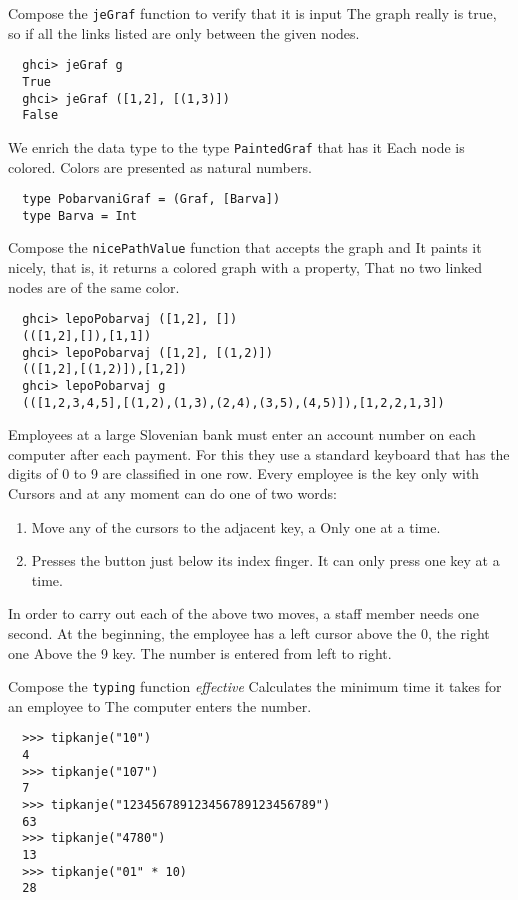 \documentclass[arhiv]{../izpit}
\begin{document}
\podnaloga
Compose the \texttt{jeGraf} function to verify that it is input
The graph really is true, so if all the links listed are only between the given nodes.
  \begin{verbatim}
  ghci> jeGraf g
  True
  ghci> jeGraf ([1,2], [(1,3)])
  False
  \end{verbatim}

\podnaloga
We enrich the data type to the type \texttt{PaintedGraf} that has it
Each node is colored. Colors are presented as natural numbers.
  \begin{verbatim}
  type PobarvaniGraf = (Graf, [Barva])
  type Barva = Int
  \end{verbatim}

Compose the \texttt{nicePathValue} function that accepts the graph and
It paints it nicely, that is, it returns a colored graph with a property,
That no two linked nodes are of the same color.
  \begin{verbatim}
  ghci> lepoPobarvaj ([1,2], [])
  (([1,2],[]),[1,1])
  ghci> lepoPobarvaj ([1,2], [(1,2)])
  (([1,2],[(1,2)]),[1,2])
  ghci> lepoPobarvaj g
  (([1,2,3,4,5],[(1,2),(1,3),(2,4),(3,5),(4,5)]),[1,2,2,1,3])
  \end{verbatim}


Employees at a large Slovenian bank must enter an account number on each computer after each payment.
For this they use a standard keyboard that has the digits of
0 to 9 are classified in one row. Every employee is the key only with
Cursors and at any moment can do one of two words:
  \begin{enumerate}
    \item Move any of the cursors to the adjacent key, a
      Only one at a time.
    \item Presses the button just below its index finger.
      It can only press one key at a time.
  \end{enumerate}

  In order to carry out each of the above two moves, a staff member needs one
  second. At the beginning, the employee has a left cursor above the 0, the
  right one Above the 9 key. The number is entered from left to right.

Compose the \texttt{typing} function {\em effective}
Calculates the minimum time it takes for an employee to
The computer enters the number.
  \begin{verbatim}
  >>> tipkanje("10")
  4
  >>> tipkanje("107")
  7
  >>> tipkanje("123456789123456789123456789")
  63
  >>> tipkanje("4780")
  13
  >>> tipkanje("01" * 10)
  28
  \end{verbatim}
\end{document}
